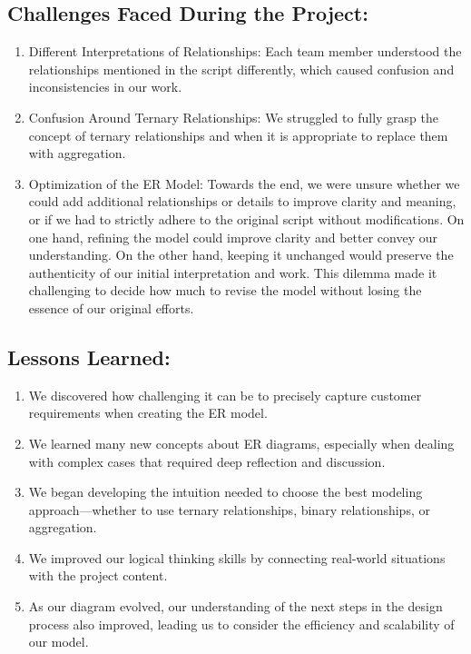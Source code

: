 \documentclass[a4paper,12pt]{article}
\begin{document}
\subsection{Challenges Faced During the Project:}
\begin{enumerate}
    \item Different Interpretations of Relationships:
Each team member understood the relationships mentioned in the script differently, which caused confusion and inconsistencies in our work.
    \item Confusion Around Ternary Relationships:
We struggled to fully grasp the concept of ternary relationships and when it is appropriate to replace them with aggregation.
    \item Optimization of the ER Model:
Towards the end, we were unsure whether we could add additional relationships or details to improve clarity and meaning, or if we had to strictly adhere to the original script without modifications. On one hand, refining the model could improve clarity and better convey our understanding. On the other hand, keeping it unchanged would preserve the authenticity of our initial interpretation and work. This dilemma made it challenging to decide how much to revise the model without losing the essence of our original efforts.
\end{enumerate}

\subsection{Lessons Learned:}

\begin{enumerate}
    \item We discovered how challenging it can be to precisely capture customer requirements when creating the ER model.
    
    \item We learned many new concepts about ER diagrams, especially when dealing with complex cases that required deep reflection and discussion.
    
    \item We began developing the intuition needed to choose the best modeling approach---whether to use ternary relationships, binary relationships, or aggregation.
    
    \item We improved our logical thinking skills by connecting real-world situations with the project content.
    
    \item As our diagram evolved, our understanding of the next steps in the design process also improved, leading us to consider the efficiency and scalability of our model.
\end{enumerate}
\newpage
\end{document}
